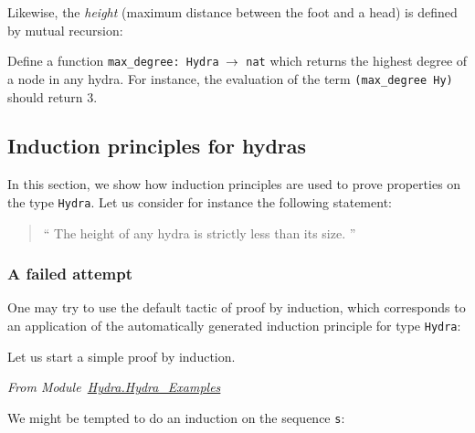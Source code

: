 Likewise, the \emph{height} (maximum distance between the foot and a head) 
is defined by mutual recursion:








\begin{exercise}
Define a function \texttt{max\_degree: Hydra $\mbox{$\rightarrow$}$ nat} which  returns the highest degree of a node in any hydra. For instance, the evaluation of the term \texttt{(max\_degree Hy)} should return $3$.
\end{exercise}

\subsection{Induction principles for hydras}
\label{sec:orgheadline42}


In this section, we show how induction principles are used to prove properties on the type 
\texttt{Hydra}. Let us consider for instance the following statement:
\begin{quote}
  `` The height of any hydra is strictly less than its size. ''
\end{quote}



\subsubsection{A failed attempt}

One may try to use the default tactic of proof by induction, which corresponds to an application of the automatically  generated  induction principle for  type \texttt{Hydra}:



Let us start a simple proof by induction.

\vspace{4pt}
\noindent
\emph{From Module~\href{../theories/html/hydras.Hydra.Hydra_Examples.html}{Hydra.Hydra\_Examples}}





We might be tempted to do an induction on the sequence \texttt{s}:



